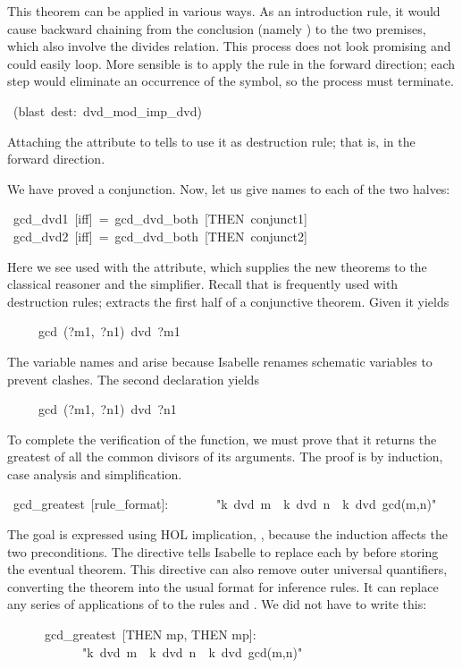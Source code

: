 %
This theorem can be applied in various ways.  As an introduction rule, it
would cause backward chaining from  the conclusion (namely
) to the two premises, which 
also involve the divides relation. This process does not look promising
and could easily loop.  More sensible is  to apply the rule in the forward
direction; each step would eliminate an occurrence of the  symbol, so the
process must terminate.  
\begin{isabelle}
\ (blast\ dest:\ dvd_mod_imp_dvd)\isanewline
{}
\end{isabelle}
Attaching the  attribute to  tells
 to use it as destruction rule; that is, in the forward direction.

\medskip
We have proved a conjunction.  Now, let us give names to each of the
two halves:
\begin{isabelle}
\ gcd_dvd1\ [iff]\ =\ gcd_dvd_both\ [THEN\ conjunct1]\isanewline
{}\ gcd_dvd2\ [iff]\ =\ gcd_dvd_both\ [THEN\ conjunct2]%
\end{isabelle}
Here we see 
used with the  attribute, which supplies the new theorems to the
classical reasoner and the simplifier.  Recall that  is
frequently used with destruction rules;  extracts the
first half of a conjunctive theorem.  Given  it yields
\begin{isabelle}
\ \ \ \ \ gcd\ (?m1,\ ?n1)\ dvd\ ?m1
\end{isabelle}
The variable names  and  arise because
Isabelle renames schematic variables to prevent 
clashes.  The second  declaration yields
\begin{isabelle}
\ \ \ \ \ gcd\ (?m1,\ ?n1)\ dvd\ ?n1
\end{isabelle}

\medskip
To complete the verification of the  function, we must 
prove that it returns the greatest of all the common divisors 
of its arguments.  The proof is by induction, case analysis and simplification.
\begin{isabelle}
\ gcd_greatest\
[rule_format]:\isanewline
\ \ \ \ \ \ \ "k\ dvd\ m\ \isasymlongrightarrow\ k\ dvd\ n\ \isasymlongrightarrow\
k\ dvd\ gcd(m,n)"
\end{isabelle}
%
The goal is expressed using HOL implication,
\isa{\isasymlongrightarrow}, because the induction affects the two
preconditions.  The directive  tells Isabelle to replace
each \isa{\isasymlongrightarrow} by \isa{\isasymLongrightarrow} before
storing the eventual theorem.  This directive can also remove outer
universal quantifiers, converting the theorem into the usual format for
inference rules.  It can replace any series of applications of
\isa{THEN} to the rules \isa{mp} and \isa{spec}.  We did not have to
write this:
\begin{isabelle}
\ \ \ \ \ \ gcd_greatest\
[THEN mp, THEN mp]:\isanewline
\ \ \ \ \ \ \ \ \ \ \ \ "k\ dvd\ m\ \isasymlongrightarrow\ k\ dvd\ n\
\isasymlongrightarrow\ k\ dvd\ gcd(m,n)"
\end{isabelle}

